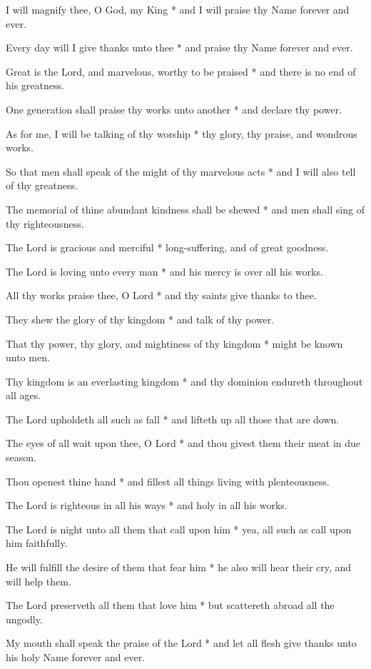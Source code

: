 \begin{multicols}{2}
	
	I will magnify thee, O God, my King * and I will praise thy Name forever and ever.
	
	Every day will I give thanks unto thee * and praise thy Name forever and ever.
	
	Great is the Lord, and marvelous, worthy to be praised * and there is no end of his greatness.
	
	One generation shall praise thy works unto another * and declare thy power.
	
	As for me, I will be talking of thy worship * thy glory, thy praise, and wondrous works.
	
	So that men shall speak of the might of thy marvelous acts * and I will also tell of thy greatness.
	
	The memorial of thine abundant kindness shall be shewed * and men shall sing of thy righteousness.
	
	The Lord is gracious and merciful * long-suffering, and of great goodness.
	
	The Lord is loving unto every man * and his mercy is over all his works.
	
	All thy works praise thee, O Lord * and thy saints give thanks to thee.
	
	They shew the glory of thy kingdom * and talk of thy power.
	
	That thy power, thy glory, and mightiness of thy kingdom * might be known unto men.
	
	Thy kingdom is an everlasting kingdom * and thy dominion endureth throughout all ages.
	
	The Lord upholdeth all such as fall * and lifteth up all those that are down.
	
	The eyes of all wait upon thee, O Lord * and thou givest them their meat in due season.
	
	Thou openest thine hand * and fillest all things living with plenteousness.
	
	The Lord is righteous in all his ways * and holy in all his works.
	
	The Lord is night unto all them that call upon him * yea, all such as call upon him faithfully.
	
	He will fulfill the desire of them that fear him * he also will hear their cry, and will help them.
	
	The Lord preserveth all them that love him * but scattereth abroad all the ungodly.
	
	My mouth shall speak the praise of the Lord * and let all flesh give thanks unto his holy Name forever and ever.
	
	\gloria{}
\end{multicols}